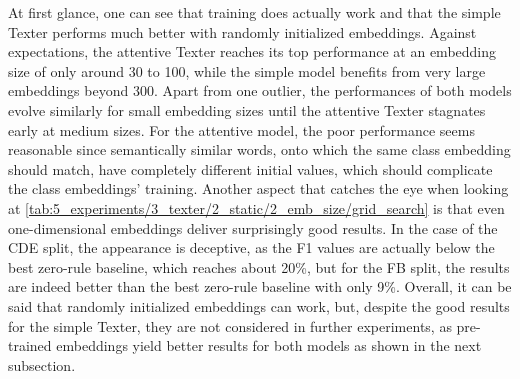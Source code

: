 At first glance, one can see that training does actually work and that the simple Texter performs much better with randomly initialized embeddings. Against expectations, the attentive Texter reaches its top performance at an embedding size of only around 30 to 100, while the simple model benefits from very large embeddings beyond 300. Apart from one outlier, the performances of both models evolve similarly for small embedding sizes until the attentive Texter stagnates early at medium sizes. For the attentive model, the poor performance seems reasonable since semantically similar words, onto which the same class embedding should match, have completely different initial values, which should complicate the class embeddings' training. Another aspect that catches the eye when looking at \autoref{tab:5_experiments/3_texter/2_static/2_emb_size/grid_search} is that even one-dimensional embeddings deliver surprisingly good results. In the case of the CDE split, the appearance is deceptive, as the F1 values are actually below the best zero-rule baseline, which reaches about 20\%, but for the FB split, the results are indeed better than the best zero-rule baseline with only 9\%. Overall, it can be said that randomly initialized embeddings can work, but, despite the good results for the simple Texter, they are not considered in further experiments, as pre-trained embeddings yield better results for both models as shown in the next subsection.
